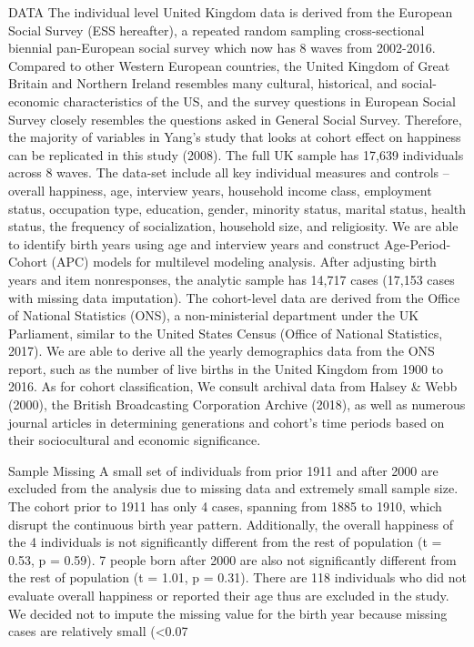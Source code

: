 DATA
The individual level United Kingdom data is derived from the European Social Survey (ESS hereafter), a repeated random sampling cross-sectional biennial pan-European social survey which now has 8 waves from 2002-2016. Compared to other Western European countries, the United Kingdom of Great Britain and Northern Ireland resembles many cultural, historical, and social-economic characteristics of the US, and the survey questions in European Social Survey closely resembles the questions asked in General Social Survey. Therefore, the majority of variables in Yang’s study that looks at cohort effect on happiness can be replicated in this study (2008). The full UK sample has 17,639 individuals across 8 waves. The data-set include all key individual measures and controls – overall happiness, age, interview years, household income class, employment status, occupation type, education, gender, minority status, marital status, health status, the frequency of socialization, household size, and religiosity. We are able to identify birth years using age and interview years and construct Age-Period-Cohort (APC) models for multilevel modeling analysis. After adjusting birth years and item nonresponses, the analytic sample has 14,717 cases (17,153 cases with missing data imputation).
The cohort-level data are derived from the Office of National Statistics (ONS), a non-ministerial department under the UK Parliament, similar to the United States Census (Office of National Statistics, 2017). We are able to derive all the yearly demographics data from the ONS report, such as the number of live births in the United Kingdom from 1900 to 2016. As for cohort classification, We consult archival data from Halsey & Webb (2000), the British Broadcasting Corporation Archive (2018), as well as numerous journal articles in determining generations and cohort’s time periods based on their sociocultural and economic significance.

Sample Missing
A small set of individuals from prior 1911 and after 2000 are excluded from the analysis due to missing data and extremely small sample size. The cohort prior to 1911 has only 4 cases, spanning from 1885 to 1910, which disrupt the continuous birth year pattern. Additionally, the overall happiness of the 4 individuals is not significantly different from the rest of population (t = 0.53, p = 0.59). 7 people born after 2000 are also not significantly different from the rest of population (t = 1.01, p = 0.31). There are 118 individuals who did not evaluate overall happiness or reported their age thus are excluded in the study. We decided not to impute the missing value for the birth year because missing cases are relatively small (<0.07%

